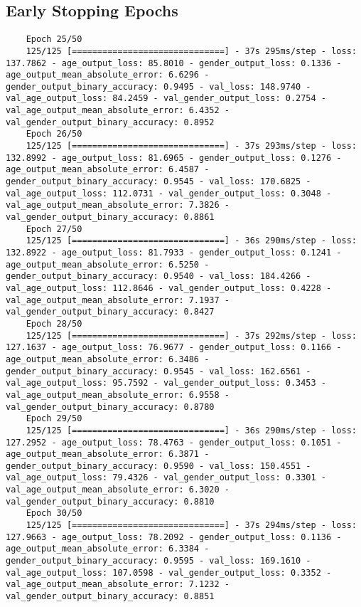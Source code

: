 \subsection{Early Stopping Epochs}\label{appendix:modelB_early_stopping_epochs}
\begin{verbatim}
    Epoch 25/50 
    125/125 [==============================] - 37s 295ms/step - loss: 137.7862 - age_output_loss: 85.8010 - gender_output_loss: 0.1336 - age_output_mean_absolute_error: 6.6296 - gender_output_binary_accuracy: 0.9495 - val_loss: 148.9740 - val_age_output_loss: 84.2459 - val_gender_output_loss: 0.2754 - val_age_output_mean_absolute_error: 6.4352 - val_gender_output_binary_accuracy: 0.8952
    Epoch 26/50
    125/125 [==============================] - 37s 293ms/step - loss: 132.8992 - age_output_loss: 81.6965 - gender_output_loss: 0.1276 - age_output_mean_absolute_error: 6.4587 - gender_output_binary_accuracy: 0.9545 - val_loss: 170.6825 - val_age_output_loss: 112.0731 - val_gender_output_loss: 0.3048 - val_age_output_mean_absolute_error: 7.3826 - val_gender_output_binary_accuracy: 0.8861
    Epoch 27/50
    125/125 [==============================] - 36s 290ms/step - loss: 132.8922 - age_output_loss: 81.7933 - gender_output_loss: 0.1241 - age_output_mean_absolute_error: 6.5250 - gender_output_binary_accuracy: 0.9540 - val_loss: 184.4266 - val_age_output_loss: 112.8646 - val_gender_output_loss: 0.4228 - val_age_output_mean_absolute_error: 7.1937 - val_gender_output_binary_accuracy: 0.8427
    Epoch 28/50
    125/125 [==============================] - 37s 292ms/step - loss: 127.1637 - age_output_loss: 76.9677 - gender_output_loss: 0.1166 - age_output_mean_absolute_error: 6.3486 - gender_output_binary_accuracy: 0.9545 - val_loss: 162.6561 - val_age_output_loss: 95.7592 - val_gender_output_loss: 0.3453 - val_age_output_mean_absolute_error: 6.9558 - val_gender_output_binary_accuracy: 0.8780
    Epoch 29/50
    125/125 [==============================] - 36s 290ms/step - loss: 127.2952 - age_output_loss: 78.4763 - gender_output_loss: 0.1051 - age_output_mean_absolute_error: 6.3871 - gender_output_binary_accuracy: 0.9590 - val_loss: 150.4551 - val_age_output_loss: 79.4326 - val_gender_output_loss: 0.3301 - val_age_output_mean_absolute_error: 6.3020 - val_gender_output_binary_accuracy: 0.8810
    Epoch 30/50
    125/125 [==============================] - 37s 294ms/step - loss: 127.9663 - age_output_loss: 78.2092 - gender_output_loss: 0.1136 - age_output_mean_absolute_error: 6.3384 - gender_output_binary_accuracy: 0.9595 - val_loss: 169.1610 - val_age_output_loss: 107.0598 - val_gender_output_loss: 0.3352 - val_age_output_mean_absolute_error: 7.1232 - val_gender_output_binary_accuracy: 0.8851
\end{verbatim}
